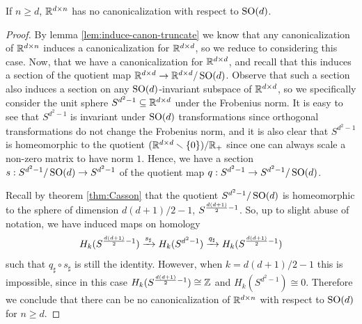 \begin{theorem}\label{thm:no-SOd-canon-for-dxn}
    If $n \geq d$, $\mathbb{R}^{d \times n}$ has no canonicalization with respect to $\operatorname{SO}(d)$.
    \begin{proof}
        By lemma \ref{lem:induce-canon-truncate} we know that any canonicalization of $\mathbb{R}^{d \times n}$ induces a canonicalization for $\mathbb{R}^{d \times d}$, so we reduce to considering this case.
        Now, \afsoc that we have a canonicalization for $\mathbb{R}^{d \times d}$, and recall that this induces a section  of the quotient map $\mathbb{R}^{d \times d} \to \mathbb{R}^{d \times d}/\operatorname{SO}(d)$.
        Observe that such a section also induces a section on any $\operatorname{SO}(d)$-invariant subspace of $\mathbb{R}^{d \times d}$, so we specifically consider the unit sphere $S^{d^2-1} \subseteq \mathbb{R}^{d \times d}$ under the Frobenius norm.
        It is easy to see that $S^{d^2-1}$ is invariant under $\operatorname{SO}(d)$ transformations since orthogonal transformations do not change the Frobenius norm, and it is also clear that $S^{d^2-1}$ is homeomorphic to the quotient $(\mathbb{R}^{d \times d} \smallsetminus \left\{ 0 \right\}) / \mathbb{R}_+$ since one can always scale a non-zero matrix to have norm $1$.
        Hence, we have a section $s : S^{d^2-1}/\operatorname{SO}(d) \to S^{d^2-1}$ of the quotient map $q : S^{d^2-1} \to S^{d^2-1}/\operatorname{SO}(d)$.

        Recall by theorem \ref{thm:Casson} that the quotient $S^{d^2-1}/\operatorname{SO}(d)$ is homeomorphic to the sphere of dimension $d(d+1)/2-1$, $S^{\frac{d(d+1)}{2} - 1}$.
        So, up to slight abuse of notation, we have induced maps on homology
        \[
            H_k(S^{\frac{d(d+1)}{2} - 1})
            \xrightarrow{s_\sharp}
            H_k(S^{d^2 - 1})
            \xrightarrow{q_\sharp}
            H_k(S^{\frac{d(d+1)}{2} - 1})
        \]
        such that $q_\sharp \circ s_\sharp$ is still the identity.
        However, when $k = d(d+1)/2-1$ this is impossible, since in this case $H_k(S^{\frac{d(d+1)}{2} - 1}) \cong \mathbb{Z}$ and $H_k(S^{d^2-1}) \cong 0$.
        Therefore we conclude that there can be no canonicalization of $\mathbb{R}^{d \times n}$ with respect to $\operatorname{SO}(d)$ for $n \geq d$.
    \end{proof}
\end{theorem}


